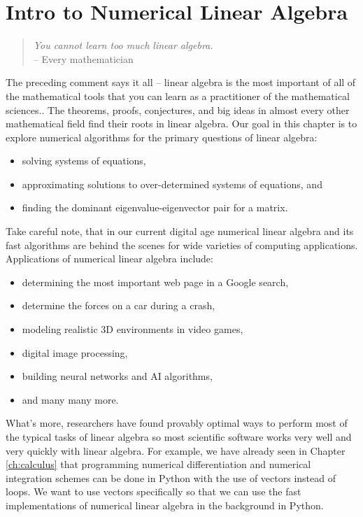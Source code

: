 \documentclass[
]{book}
\providecommand{\tightlist}{%
  \setlength{\itemsep}{0pt}\setlength{\parskip}{0pt}}
\theoremstyle{definition}
\theoremstyle{definition}
\theoremstyle{definition}
\theoremstyle{remark}
\begin{document}
\hypertarget{intro-to-numerical-linear-algebra}{%
\section{Intro to Numerical Linear Algebra}\label{intro-to-numerical-linear-algebra}}

\begin{quote}
\emph{You cannot learn too much linear algebra.}\\
-- Every mathematician
\end{quote}

The preceding comment says it all -- linear algebra is the most important of all of the mathematical tools that you can learn as a practitioner of the mathematical sciences.. The theorems, proofs, conjectures, and big ideas in almost every other mathematical field find their roots in linear algebra. Our goal in this chapter is to explore numerical algorithms for the primary questions of
linear algebra:

\begin{itemize}
\tightlist
\item
  solving systems of equations,
\item
  approximating solutions to over-determined systems of equations, and
\item
  finding the dominant eigenvalue-eigenvector pair for a matrix.
\end{itemize}

Take careful note, that in our current digital age numerical linear algebra and its fast algorithms are behind the scenes for wide varieties of computing applications. Applications of numerical linear algebra include:

\begin{itemize}
\tightlist
\item
  determining the most important web page in a Google search,
\item
  determine the forces on a car during a crash,
\item
  modeling realistic 3D environments in video games,
\item
  digital image processing,
\item
  building neural networks and AI algorithms,
\item
  and many many more.
\end{itemize}

What's more, researchers have found provably optimal ways to perform most of the typical tasks of linear algebra so most scientific software works very well and very quickly with linear algebra. For example, we have already seen in Chapter \ref{ch:calculus} that programming numerical differentiation and numerical integration schemes can be done in Python with the use of vectors instead of loops. We want to use vectors specifically so that we can use the fast implementations of numerical linear algebra in the background in Python.
\end{document}

